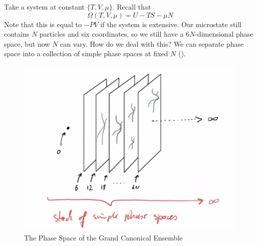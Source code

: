\documentclass[a4paper,twoside,master.tex]{subfiles}
\begin{document}

Take a system at constant $ \{T,V,\mu\} $. Recall that
\begin{equation}
    \Omega(T,V, \mu) = U-TS- \mu N
\end{equation}
Note that this is equal to $ -PV $ if the system is extensive. Our microstate still contains $ N $ particles and six coordinates, so we still have a $ 6N $-dimensional phase space, but now $ N $ can vary. How do we deal with this? We can separate phase space into a collection of simple phase spaces at fixed $ N $ ().

\begin{figure}[h]
    \centering
    \includegraphics[width=\textwidth]{figures/lec_28_grand_canonical_phase_space.png}
    \caption{The Phase Space of the Grand Canonical Ensemble}
    \label{fig:lec_28_grand_canonical_phase_space}
\end{figure}
\end{document}
